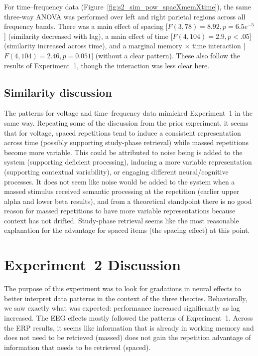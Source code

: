 For time--frequency data (Figure~\ref{fig:s2_sim_pow_spacXmemXtime}), the same three-way ANOVA was performed over left and right parietal regions across all frequency bands.
There was a main effect of spacing [$F(3,78)=8.92, p=6.5e^{-5}$] (similarity decreased with lag), a main effect of time [$F(4,104)=2.9, p<.05$] (similarity increased across time), and a marginal memory $\times$ time interaction [$F(4,104)=2.46, p=0.051$] (without a clear pattern).  These also follow the results of Experiment~1, though the interaction was less clear here.

\subsection{Similarity discussion}

The patterns for voltage and time--frequency data mimicked Experiment~1 in the same way.  Repeating some of the discussion from the prior experiment, it seems that for voltage, spaced repetitions tend to induce a consistent representation across time (possibly supporting study-phase retrieval) while massed repetitions become more variable.  This could be attributed to noise being is added to the system (supporting deficient processing), inducing a more variable representation (supporting contextual variability), or engaging different neural/cognitive processes.  It does not seem like noise would be added to the system when a massed stimulus received semantic processing at the repetition (earlier upper alpha and lower beta results), and from a theoretical standpoint there is no good reason for massed repetitions to have more variable representations because context has not drifted.  Study-phase retrieval seems like the most reasonable explanation for the advantage for spaced items (the spacing effect) at this point.



\section{Experiment~2 Discussion}

\cbstart
The purpose of this experiment was to look for gradations in neural effects to better interpret data patterns in the context of the three theories.
Behaviorally, we saw exactly what was expected: performance increased significantly as lag increased.  The EEG effects mostly followed the patterns of Experiment~1.  Across the ERP results, it seems like information that is already in working memory and does not need to be retrieved (massed) does not gain the repetition advantage of information that needs to be retrieved (spaced).

